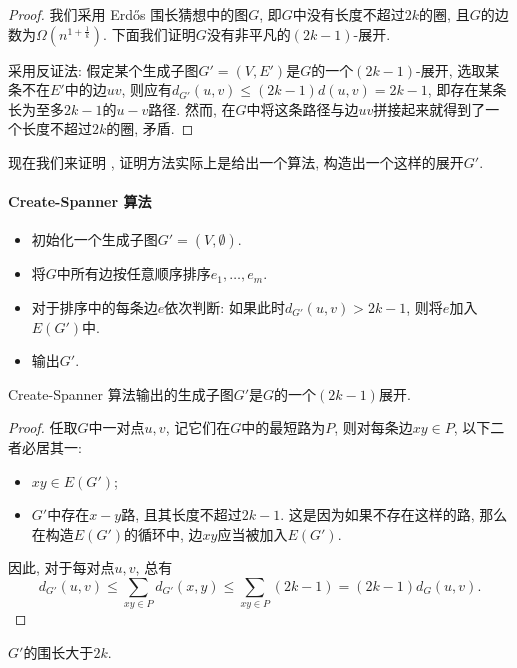 \begin{proof}
    我们采用 Erdős 围长猜想中的图$G$, 即$G$中没有长度不超过$2k$的圈, 且$G$的边数为$\Omega(n^{1+\frac{1}{k}})$. 下面我们证明$G$没有非平凡的$(2k-1)$-展开.

    采用反证法: 假定某个生成子图$G'=(V,E')$是$G$的一个$(2k-1)$-展开, 选取某条不在$E'$中的边$uv$, 则应有$d_{G'}(u,v)\le (2k-1)d(u,v)=2k-1$, 即存在某条长为至多$2k-1$的$u-v$路径. 然而, 在$G$中将这条路径与边$uv$拼接起来就得到了一个长度不超过$2k$的圈, 矛盾.
\end{proof}

现在我们来证明  , 证明方法实际上是给出一个算法, 构造出一个这样的展开$G'$.

\paragraph{Create-Spanner 算法}   
\begin{itemize}
    \item 初始化一个生成子图$G'=(V,\emptyset)$.
    \item 将$G$中所有边按任意顺序排序$e_1,\ldots,e_m$.
    \item 对于排序中的每条边$e$依次判断: 如果此时$d_{G'}(u,v)>2k-1$, 则将$e$加入$E(G')$中.
    \item 输出$G'$.
\end{itemize}

\begin{claim}
    Create-Spanner 算法输出的生成子图$G'$是$G$的一个$(2k-1)$展开.
\end{claim}

\begin{proof}
    任取$G$中一对点$u,v$, 记它们在$G$中的最短路为$P$, 则对每条边$xy\in P$, 以下二者必居其一:
    
    \begin{itemize}
        \item $xy\in E(G')$;
        \item $G'$中存在$x-y$路, 且其长度不超过$2k-1$. 这是因为如果不存在这样的路, 那么在构造$E(G')$的循环中, 边$xy$应当被加入$E(G')$.
    \end{itemize}
    
    因此, 对于每对点$u,v$, 总有
    \[
    d_{G'}(u,v)\le\sum_{xy\in P}d_{G'}(x,y)\le\sum_{xy\in P}(2k-1)=(2k-1)d_{G}(u,v).
    \]
\end{proof}

\begin{claim}
    $G'$的围长大于$2k$.
\end{claim}

